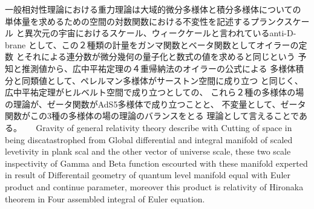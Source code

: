 \documentclass{jsarticle}
\begin{document}
{一般相対性理論における重力理論は大域的微分多様体と積分多様体についての 単体量を求めるための空間の対数関数における不変性を記述するプランクスケール と異次元の宇宙におけるスケール、ウィークケールと言われているanti-D-brane として、この２種類の計量をガンマ関数とベータ関数としてオイラーの定数 とそれによる連分数が微分幾何の量子化と数式の値を求めると同じという 予知と推測値から、広中平祐定理の４重帰納法のオイラーの公式による 多様体積分と同類値として、ペレルマン多様体がサーストン空間に成り立つ と同じく、広中平祐定理がヒルベルト空間で成り立つとしての、 これら２種の多様体の場の理論が、ゼータ関数がAdS5多様体で成り立つことと、 不変量として、ゼータ関数がこの3種の多様体の場の理論のバランスをとる
  理論として言えることである。
  　 Gravity of general relativity theory describe with Cutting of space
in being discatastrophed from Global differential and integral manifold
of scaled levetivity in plank scal and the other vector of universe
scale, these two scale inspectivity of Gamma and Beta function escourted
with these manifold experted in result of Differentail geometry of
quantum level manifold equal with Euler product and continue parameter,
moreover this product is relativity of Hironaka theorem in Four assembled
integral of Euler equation.

}
\end{document}
